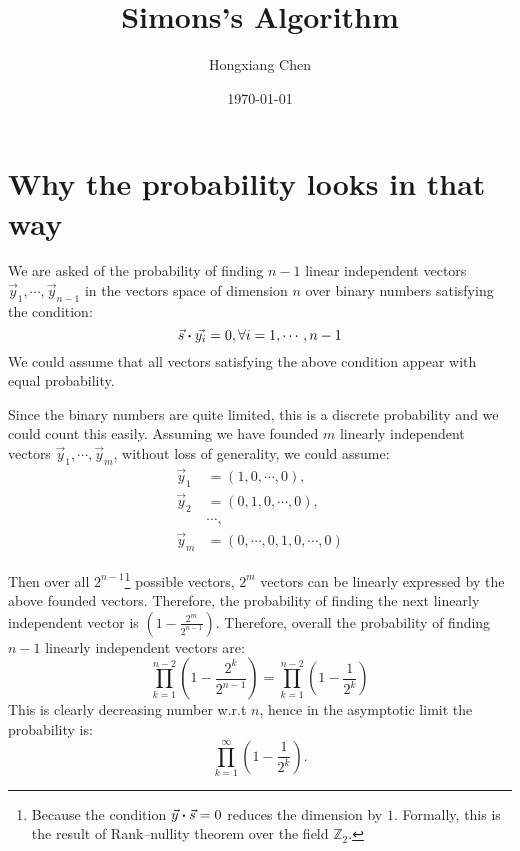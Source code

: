 \documentclass{article}
\title{Simons's Algorithm}
\date{\today}
\author{Hongxiang Chen}
\begin{document}
\maketitle
{}

\section{Why the probability looks in that way}
\label{sec:Why the probability looks in that way}

We are asked of the probability of finding $n-1$ linear independent vectors
$\vec{y}_1,\cdots,\vec{y}_{n-1}$ in the vectors space of dimension $n$ over
binary numbers satisfying the condition:
\begin{equation}
  \vec{s}\vdot\vec{y_i} = 0, \forall i=1,\cdots,n-1
\end{equation}
We could assume that all vectors satisfying the above condition appear with equal
probability.

Since the binary numbers are quite limited, this is a discrete probability and
we could count this easily. Assuming we have founded $m$ linearly independent
vectors $\vec{y}_1,\cdots,\vec{y}_m$, without loss of generality, we could
assume:
\begin{align}
  \vec{y}_1 &= (1,0,\cdots,0), \\
  \vec{y}_2 &= (0,1,0,\cdots,0), \\
            &\cdots, \nonumber\\
  \vec{y}_m &= (0,\cdots,0,1,0,\cdots,0)
\end{align}

Then over all $2^{n-1}$\footnote{Because the condition $\vec{y}\vdot\vec{s}=0$
reduces the dimension by $1$. Formally, this is the result of Rank–nullity
theorem over the field $\mathbb{Z}_2$.} possible vectors, $2^m$ vectors can be linearly expressed by the
above founded vectors. Therefore, the probability of finding the next linearly
independent vector is $\left(1-\frac{2^m}{2^{n-1}}\right)$. Therefore, overall the probability
of finding $n-1$ linearly independent vectors are:
\begin{equation}
  \prod_{k=1}^{n-2}\left(1-\frac{2^k}{2^{n-1}}\right) = \prod_{k=1}^{n-2}
  \left(1-\frac{1}{2^k}\right)
\end{equation}
This is clearly decreasing number w.r.t $n$, hence in the asymptotic limit the
probability is:
\begin{equation}
  \prod_{k=1}^{\infty}\left(1-\frac{1}{2^k}\right).
\end{equation}
\end{document}
